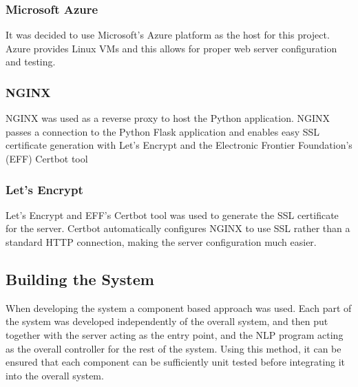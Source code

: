 \documentclass[12pt,a4paper]{article}
\begin{document}
    \subsubsection*{Microsoft Azure}
    It was decided to use Microsoft's Azure platform as the host for this project. Azure provides Linux VMs and this allows for proper web server configuration and testing.
    
    \subsubsection*{NGINX}
    NGINX was used as a reverse proxy to host the Python application. NGINX passes a connection to the Python Flask application and enables easy SSL certificate generation with Let's Encrypt and the Electronic Frontier Foundation's (EFF) Certbot tool %
    
    \subsubsection*{Let's Encrypt}
    Let's Encrypt and EFF's Certbot tool was used to generate the SSL certificate for the server. Certbot automatically configures NGINX to use SSL rather than a standard HTTP connection, making the server configuration much easier.
    
    \subsection{Building the System}
    When developing the system a component based approach was used. Each part of the system was developed independently of the overall system, and then put together with the server acting as the entry point, and the NLP program acting as the overall controller for the rest of the system. Using this method, it can be ensured that each component can be sufficiently unit tested before integrating it into the overall system.
    
\end{document}

